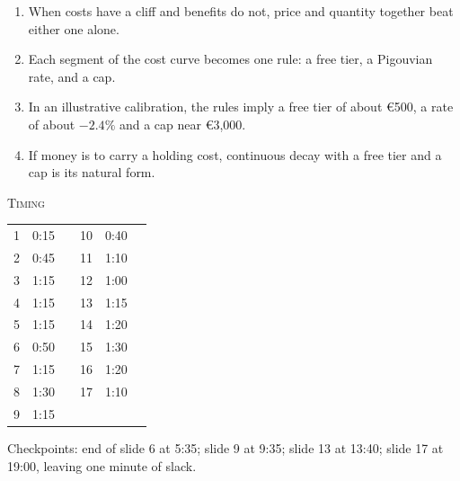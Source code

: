 \documentclass[a4paper,10pt]{article}
\newcommand{\quiet}[1]{{\color{quiet}#1}}
\newcommand{\kicker}[1]{{\footnotesize\scshape\color{accent}#1}}
\begin{document}
\begin{enumerate}[leftmargin=2em,itemsep=0.25em]
  \item[\quiet{14}] When costs have a cliff and benefits do not, price and quantity together beat either one alone.
  \item[\quiet{15}] Each segment of the cost curve becomes one rule: a free tier, a Pigouvian rate, and a cap.
  \item[\quiet{16}] In an illustrative calibration, the rules imply a free tier of about \euro 500, a rate of about $-2.4\%$ and a cap near \euro 3{,}000.
  \item[\quiet{17}] If money is to carry a holding cost, continuous decay with a free tier and a cap is its natural form.
\end{enumerate}

\vspace{0.5cm}
\begin{minipage}[t]{0.40\textwidth}
\kicker{Timing}\par\medskip
\footnotesize
\begin{tabular}{@{}rlr@{\qquad}rlr@{}}
  1 & 0:15 & & 10 & 0:40 \\
  2 & 0:45 & & 11 & 1:10 \\
  3 & 1:15 & & 12 & 1:00 \\
  4 & 1:15 & & 13 & 1:15 \\
  5 & 1:15 & & 14 & 1:20 \\
  6 & 0:50 & & 15 & 1:30 \\
  7 & 1:15 & & 16 & 1:20 \\
  8 & 1:30 & & 17 & 1:10 \\
  9 & 1:15 & & & \\
\end{tabular}

\smallskip
\quiet{Checkpoints: end of slide 6 at 5:35; slide 9 at 9:35; slide 13 at 13:40; slide 17 at 19:00, leaving one minute of slack.}
\end{minipage}\hfill
\end{document}

